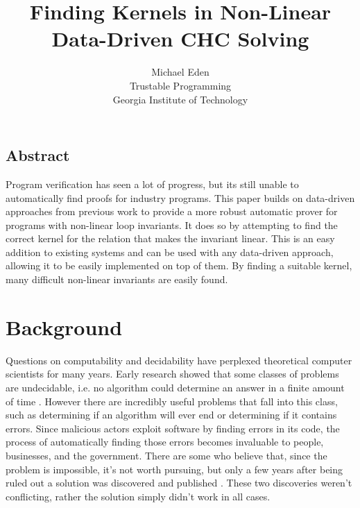\documentclass[letterpaper,twocolumn,10pt]{article}
\begin{document}
\date{}

\title{\Large \bf Finding Kernels in Non-Linear Data-Driven CHC Solving}

\author{
{\rm Michael Eden}\\
Trustable Programming \\
Georgia Institute of Technology
}

\maketitle



\subsection*{Abstract}

Program verification has seen a lot of progress, but its still unable to
automatically find proofs for industry programs. This paper builds on
data-driven approaches from previous work \cite{data-driven} to provide a
more robust automatic prover for programs with non-linear loop invariants.
It does so by attempting to find the correct kernel for the relation that makes
the invariant linear. This is an easy addition to existing systems and can be
used with any data-driven approach, allowing it to be easily implemented on top
of them. By finding a suitable kernel, many difficult non-linear invariants are
easily found.

\section{Background}

Questions on computability and decidability have perplexed theoretical computer
scientists for many years. Early research showed that some classes of problems
are undecidable, i.e. no algorithm could determine an answer in a finite amount
of time​ \cite{turing}​. However there are incredibly useful problems that fall
into this class,
such as determining if an algorithm will ever end or determining if it contains
errors. Since malicious actors exploit software by finding errors in its code, the
process of automatically finding those errors becomes invaluable to people,
businesses, and the government. There are some who believe that, since the
problem is impossible, it’s not worth pursuing, but only a few years after being
ruled out a solution was discovered and published​ \cite{turing}​.
These two discoveries
weren't conflicting, rather the solution simply didn’t work in all cases.
\end{document}
